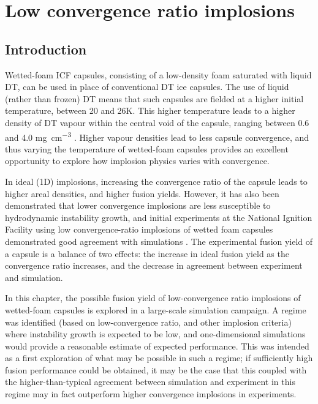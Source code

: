 

\chapter{Low convergence ratio implosions} \label{ch-lowCR}

\minitoc

\section{Introduction}

Wetted-foam ICF capsules, consisting of a low-density foam saturated with liquid DT, can be used in place of conventional DT ice capsules. The use of liquid (rather than frozen) DT means that such capsules are fielded at a higher initial temperature, between 20 and 26K. This higher temperature leads to a higher density of DT vapour within the central void of the capsule, ranging between 0.6 and 4.0 \unit{\milli\gram\per\centi\meter\cubed} \cite{Olson2016}. Higher vapour densities lead to less capsule convergence, and thus varying the temperature of wetted-foam capsules provides an excellent opportunity to explore how implosion physics varies with convergence.

In ideal (1D) implosions, increasing the convergence ratio of the capsule leads to higher areal densities, and higher fusion yields. However, it has also been demonstrated that lower convergence implosions are less susceptible to hydrodynamic instability growth, and initial experiments at the National Ignition Facility using low convergence-ratio implosions of wetted foam capsules demonstrated good agreement with simulations  \cite{Olson2016, Zylstra2018}. The experimental fusion yield of a capsule is a balance of two effects: the increase in ideal fusion yield as the convergence ratio increases, and the decrease in agreement between experiment and simulation.

In this chapter, the possible fusion yield of low-convergence ratio implosions of wetted-foam capsules is explored in a large-scale simulation campaign. A regime was identified (based on low-convergence ratio, and other implosion criteria) where instability growth is expected to be low, and one-dimensional simulations would provide a reasonable estimate of expected performance. This was intended as a first exploration of what may be possible in such a regime; if sufficiently high fusion performance could be obtained, it may be the case that this coupled with the higher-than-typical agreement between simulation and experiment in this regime may in fact outperform higher convergence implosions in experiments.

